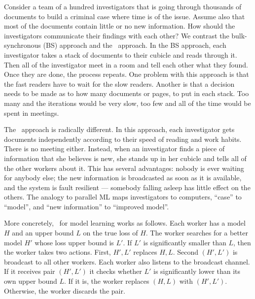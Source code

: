 Consider a team of a hundred investigators that is going through
thousands of documents to build a criminal case where time is of the
issue. Assume also that most of the documents contain little or no new
information. How should the investigators communicate their findings
with each other? We contrast the bulk-synchronous (BS) approach and the
\tmsn\ approach. In the BS approach, each investigator takes a stack
of documents to their cubicle and reads through it. Then all of the
investigator meet in a room and tell each other what they found. Once
they are done, the process repeats. One problem with this approach is
that the fast readers have to wait for the slow readers. Another is
that a decision needs to be made as to how many documents or pages, to
put in each stack. Too many and the iterations would be very slow, too
few and all of the time would be spent in meetings.

The \tmsn\ approach is radically different. In this approach, each
investigator gets documents independently according to their speed of
reading and work habits. There is no meeting either. Instead, when
an investigator finds a piece of information that she believes is new,
she stands up in her cubicle and tells all of the other workers about
it. This has several advantages: nobody is ever waiting for anybody
else; the new information is broadcasted as soon as it is available, and
the system is fault resilient --- somebody falling asleep has little
effect on the others.
The analogy to parallel ML maps investigators
to computers, ``case'' to ``model'', and ``new information'' to
``improved model''.

\iffalse
Consider a team of investigators that is going through
thousands of documents to build a criminal case. Assume also that most
of the documents contain no new information. It makes little sense for
them to send each other a summary of each document they read, they
would just be wasting each other's time that way. What would make more
sense is for each to sit reading in their cubicle until one of them
identifies a document with new information, that person than stands
up, interrupts all of the other people, and gives each of them a
summary of what they found. This ensures that all of the investigators
are updated as soon as new information is available, but are otherwise
left to do their work.
\fi

More concretely, \tmsn\ for model learning works as follows. Each
worker has a model $H$ and an upper bound $L$ on the true loss of
$H$. The worker searches for a better model $H'$ whose loss upper
bound is $L'$. If $L'$ is significantly smaller than $L$, then the
worker takes two actions. First, $H',L'$ replaces $H,L$. Second
$(H',L')$ is broadcast to all other workers.  Each worker also listens
to the broadcast channel. If it receives pair $(H',L')$ it checks
whether $L'$ is significantly lower than its own upper bound $L$. If
it is, the worker replaces $(H,L)$ with $(H',L')$. Otherwise, the worker discards the
pair.

